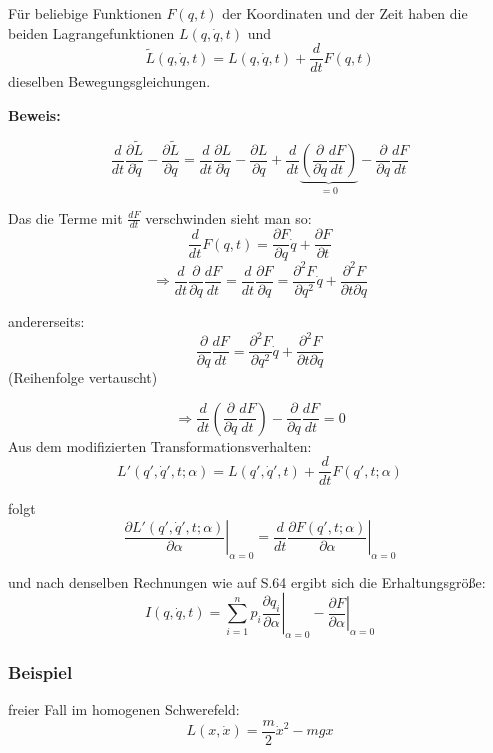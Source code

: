 \documentclass[10pt, letterpaper]{article}
\begin{document}
Für beliebige Funktionen $F(q,t)$ der Koordinaten und der Zeit haben die beiden Lagrangefunktionen $L(q,\dot{q},t)$ und 
\[\tilde{L}(q,\dot{q},t) = L(q,\dot{q},t) + \frac{d}{dt}F(q,t)\] dieselben Bewegungsgleichungen.




\textbf{Beweis:}

\[\frac{d}{dt}\frac{\partial \tilde{L}}{\partial \dot{q}} - \frac{\partial \tilde{L}}{\partial q} = \frac{d}{dt}\frac{\partial L}{\partial \dot{q}} - \frac{\partial L}{\partial q} + \frac{d}{dt}\underbrace{\left(\frac{\partial}{\partial \dot{q}}\frac{dF}{dt}\right)}_{=0} - \frac{\partial}{\partial q}\frac{dF}{dt}\]

Das die Terme mit $\frac{dF}{dt}$ verschwinden sieht man so:
\[\frac{d}{dt}F(q,t) = \frac{\partial F}{\partial q}\dot{q} + \frac{\partial F}{\partial t}\]
\[\Rightarrow \frac{d}{dt}\frac{\partial}{\partial q}\frac{dF}{dt} = \frac{d}{dt}\frac{\partial F}{\partial q} = \frac{\partial^2 F}{\partial q^2}\dot{q} + \frac{\partial^2 F}{\partial t\partial q}\]

andererseits: \[\frac{\partial}{\partial q}\frac{dF}{dt} = \frac{\partial^2 F}{\partial q^2}\dot{q} + \frac{\partial^2 F}{\partial t\partial q}\]
(Reihenfolge vertauscht)

\[\Rightarrow \frac{d}{dt}\left(\frac{\partial}{\partial \dot{q}}\frac{dF}{dt}\right) - \frac{\partial}{\partial q}\frac{dF}{dt} = 0\]
Aus dem modifizierten Transformationsverhalten:
\[L'(q',\dot{q}',t;\alpha) = L(q',\dot{q}',t) + \frac{d}{dt}F(q',t;\alpha)\]

folgt
\[\left.\frac{\partial L'(q',\dot{q}',t;\alpha)}{\partial \alpha}\right|_{\alpha=0} = \frac{d}{dt}\left.\frac{\partial F(q',t;\alpha)}{\partial \alpha}\right|_{\alpha=0}\]

und nach denselben Rechnungen wie auf S.64 ergibt sich die Erhaltungsgröße:
\[I(q,\dot{q},t) = \sum_{i=1}^n p_i\left.\frac{\partial q_i}{\partial \alpha}\right|_{\alpha=0} - \left.\frac{\partial F}{\partial \alpha}\right|_{\alpha=0}\]





\subsubsection{Beispiel} 

freier Fall im homogenen Schwerefeld:
\[L(x,\dot{x}) = \frac{m}{2}\dot{x}^2 - mgx\]
\end{document}
